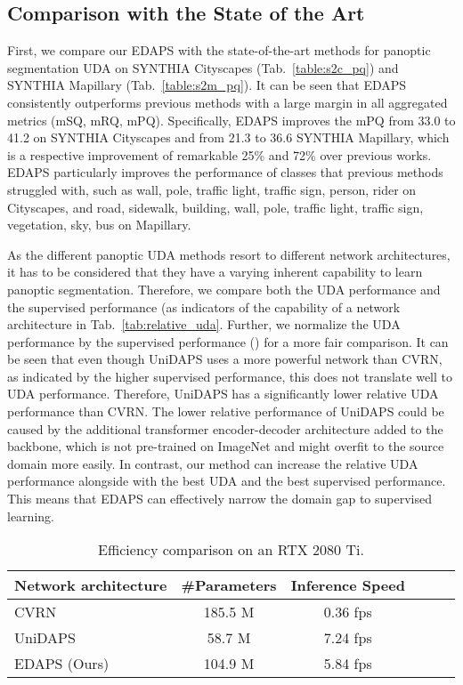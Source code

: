 \documentclass[10pt,twocolumn,letterpaper]{article}
\begin{document}
\subsection{Comparison with the State of the Art}

First, we compare our EDAPS with the state-of-the-art methods for panoptic segmentation UDA on SYNTHIA  Cityscapes (Tab.~\ref{table:s2c_pq}) and SYNTHIA  Mapillary (Tab.~\ref{table:s2m_pq}). It can be seen that EDAPS consistently outperforms previous methods with a large margin in all aggregated metrics (mSQ, mRQ, mPQ). Specifically, EDAPS improves the mPQ from 33.0 to 41.2 on SYNTHIA  Cityscapes and from 21.3 to 36.6 SYNTHIA  Mapillary, which is a respective improvement of remarkable 25\% and 72\% over previous works. 
EDAPS particularly improves the performance of classes that previous methods struggled with, such as wall, pole, traffic light, traffic sign, person, rider on Cityscapes, and road, sidewalk, building, wall, pole, traffic light, traffic sign, vegetation, sky, bus on Mapillary.

As the different panoptic UDA methods resort to different network architectures, it has to be considered that they have a varying inherent capability to learn panoptic segmentation. Therefore, we compare both the UDA performance and the supervised performance (as indicators of the capability of a network architecture in Tab.~\ref{tab:relative_uda}. Further, we normalize the UDA performance by the supervised performance () for a more fair comparison. 
It can be seen that even though UniDAPS uses a more powerful network than CVRN, as indicated by the higher supervised performance, this does not translate well to UDA performance. Therefore, UniDAPS has a significantly lower relative UDA performance than CVRN. The lower relative performance of UniDAPS could be caused by the additional transformer encoder-decoder architecture added to the backbone, which is not pre-trained on ImageNet and might overfit to the source domain more easily.
In contrast, our method can increase the relative UDA performance alongside with the best UDA and the best supervised performance. This means that EDAPS can effectively narrow the domain gap to supervised learning.

\begingroup
\setlength{\tabcolsep}{3.5pt} 
\renewcommand{\arraystretch}{1.3}
\begin{table}
\centering
\caption{
Efficiency comparison on an RTX 2080 Ti.
}
\footnotesize
\begin{tabular}{l @{\quad} ccccc}

\toprule 

Network architecture & \#Parameters & Inference Speed  \\
\midrule
CVRN~\cite{huang2021cross}                  & 185.5 M   & 0.36 fps \\
UniDAPS~\cite{zhang2022hierarchical}        & 58.7 M    & 7.24 fps \\
EDAPS (Ours)                                & 104.9 M   & 5.84 fps \\
\bottomrule
\end{tabular} \label{tab:efficiency}
\end{table}
\endgroup
\end{document}
